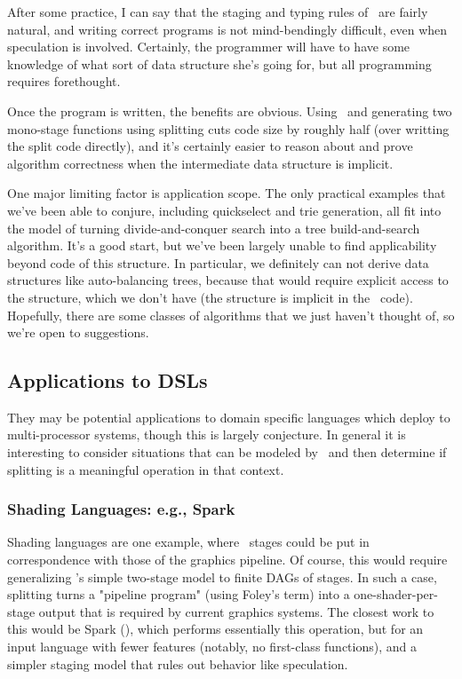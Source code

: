 After some practice, I can say that the staging and typing rules of \lang\ are fairly natural, 
and writing correct programs is not mind-bendingly difficult, even when speculation is involved.
Certainly, the programmer will have to have some knowledge of what sort of data structure she's going for,
but all programming requires forethought.

Once the program is written, the benefits are obvious.
Using \lang\ and generating two mono-stage functions using splitting cuts code size by roughly half (over writting the split code directly),
and it's certainly easier to reason about and prove algorithm correctness when the intermediate data structure is implicit.

One major limiting factor is application scope.  
The only practical examples that we've been able to conjure, including quickselect and trie generation, 
all fit into the model of turning divide-and-conquer search into a tree build-and-search algorithm.  
It's a good start, but we've been largely unable to find applicability beyond code of this structure.
In particular, we definitely can not derive data structures like auto-balancing trees, 
because that would require explicit access to the structure, which we don't have (the structure is implicit in the \lang\ code).
Hopefully, there are some classes of algorithms that we just haven't thought of, so we're open to suggestions.

\subsection {Applications to DSLs}

They may be potential applications to domain specific languages which deploy to multi-processor systems, 
though this is largely conjecture.
In general it is interesting to consider situations that can be modeled by \lang\, and then determine if splitting is a meaningful operation in that context.

\subsubsection{Shading Languages: e.g., Spark}

Shading languages are one example, 
where \lang\ stages could be put in correspondence with those of the graphics pipeline.
Of course, this would require generalizing \lang's simple two-stage model to finite DAGs of stages.
In such a case, splitting turns a "pipeline program" (using Foley's term) into a one-shader-per-stage output that is required by current graphics systems.
The closest work to this would be Spark (\cite{Foley:2011}), which performs essentially this
operation, but for an input language with fewer features (notably, no first-class functions), 
and a simpler staging model that rules out behavior like speculation.

